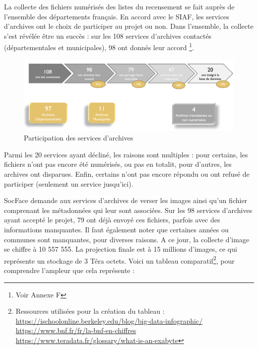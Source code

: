 La collecte des fichiers numérisés des listes du recensement se fait auprès de l’ensemble des départements français. En accord avec le \gls{SIAF}, les services d’archives ont le choix de participer au projet ou non. Dans l’ensemble, la collecte s’est révélée être un succès : sur les 108 services d'archives contactés (départementales et municipales), 98 ont donnés leur accord \footnote{Voir Annexe F}.  

      \begin{figure}[H]
        \centering
        \includegraphics[width=0.9\linewidth]{Figures/Partie 1/Fig.1.2 - Participation des services d'archives.png}
        \caption[Participation des services d'archives]{Participation des services d'archives}
        \label{fig:Fig1.2}
    \end{figure}

Parmi les 20 services ayant décliné, les raisons sont multiples : pour certains, les fichiers n'ont pas encore été numérisés, ou pas en totalit, pour d'autres, les archives ont disparues. Enfin, certains n'ont pas encore répondu ou ont refusé de participer (seulement un service jusqu'ici).

SocFace demande aux services d’archives de verser les images ainsi qu’un fichier comprenant les métadonnées qui leur sont associées. Sur les 98 services d’archives ayant accepté le projet, 79 ont déjà envoyé ces fichiers, parfois avec des informations manquantes. Il faut également noter que certaines années ou communes sont manquantes, pour diverses raisons. A ce jour, la collecte d’image se chiffre à 10 557 555. La projection finale est à 15 millions d’images, ce qui représente un stockage de 3 Téra octets. Voici un tableau comparatif\footnote{Ressources utilisées pour la création du tableau : \\ 
\href{https://ischoolonline.berkeley.edu/blog/big-data-infographic/}{https://ischoolonline.berkeley.edu/blog/big-data-infographic/}\\ 
\href{https://www.bnf.fr/fr/la-bnf-en-chiffres}{https://www.bnf.fr/fr/la-bnf-en-chiffres}\\
\href{https://www.teradata.fr/glossary/what-is-an-exabyte}{https://www.teradata.fr/glossary/what-is-an-exabyte}
}, pour comprendre l'ampleur que cela représente  :  

